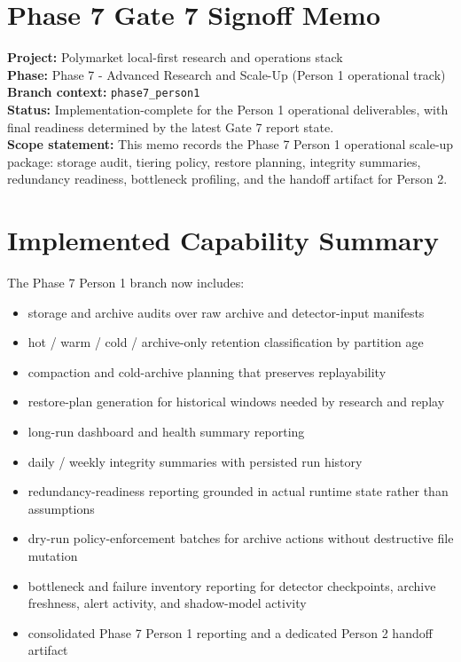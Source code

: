 \documentclass{article}
\begin{document}
\section*{Phase 7 Gate 7 Signoff Memo}

\textbf{Project:} Polymarket local-first research and operations stack\\
\textbf{Phase:} Phase 7 - Advanced Research and Scale-Up (Person 1 operational track)\\
\textbf{Branch context:} \texttt{phase7\_person1}\\
\textbf{Status:} Implementation-complete for the Person 1 operational deliverables, with final readiness determined by the latest Gate 7 report state.\\
\textbf{Scope statement:} This memo records the Phase 7 Person 1 operational scale-up package: storage audit, tiering policy, restore planning, integrity summaries, redundancy readiness, bottleneck profiling, and the handoff artifact for Person 2.

\section*{Implemented Capability Summary}
The Phase 7 Person 1 branch now includes:
\begin{itemize}
\item storage and archive audits over raw archive and detector-input manifests
\item hot / warm / cold / archive-only retention classification by partition age
\item compaction and cold-archive planning that preserves replayability
\item restore-plan generation for historical windows needed by research and replay
\item long-run dashboard and health summary reporting
\item daily / weekly integrity summaries with persisted run history
\item redundancy-readiness reporting grounded in actual runtime state rather than assumptions
\item dry-run policy-enforcement batches for archive actions without destructive file mutation
\item bottleneck and failure inventory reporting for detector checkpoints, archive freshness, alert activity, and shadow-model activity
\item consolidated Phase 7 Person 1 reporting and a dedicated Person 2 handoff artifact
\end{itemize}
\end{document}

